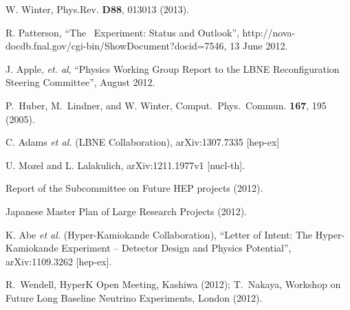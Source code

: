 


W. Winter, 
Phys.Rev. \textbf{D88}, 013013 (2013). 

 R. Patterson, ``The \NOvA\ Experiment: Status and Outlook'', http://nova-docdb.fnal.gov/cgi-bin/ShowDocument?docid=7546, 13 June 2012.



 J. Apple, {\it{et. al}}, ``Physics Working Group Report to the LBNE Reconfiguration Steering Committee'', August 2012.

 {P.\ Huber, M.\ Lindner, and W. Winter, Comput.\ Phys.\ Commun. \textbf{167}, 195 (2005).}

 C. Adams {\it et al.} (LBNE Collaboration), arXiv:1307.7335 [hep-ex]

 U. Mozel and L. Lalakulich, 
arXiv:1211.1977v1 [nucl-th].



Report of the Subcommittee on Future HEP projects (2012).  

Japanese Master Plan of Large Research Projects (2012). 


K. Abe {\em et al.} (Hyper-Kamiokande Collaboration), ``Letter of
Intent: The Hyper-Kamiokande Experiment -- Detector Design and Physics
Potential'', arXiv:1109.3262 [hep-ex]. 

R.\ Wendell, HyperK Open Meeting, Kashiwa (2012); 
T.\ Nakaya, Workshop on Future Long Baseline Neutrino Experiments,
London (2012). 

